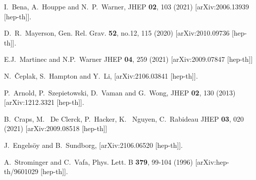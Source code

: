 \documentclass[11pt]{article}
\begin{document}
\begin{thebibliography}{99}
  
 
  
I.~Bena, A.~Houppe and N.~P.~Warner,
JHEP \textbf{02}, 103 (2021)
[arXiv:2006.13939 [hep-th]].
 
 


D.~R.~Mayerson,
Gen. Rel. Grav. \textbf{52}, no.12, 115 (2020)
[arXiv:2010.09736 [hep-th]].


E.J.~Martinec and N.P.~Warner
JHEP {\bf 04}, 259 (2021)
[arXiv:2009.07847 [hep-th]]


N.~Čeplak, S.~Hampton and Y.~Li,
[arXiv:2106.03841 [hep-th]].

 



P.~Arnold, P.~Szepietowski, D.~Vaman and G.~Wong,
JHEP \textbf{02}, 130 (2013)
[arXiv:1212.3321 [hep-th]].

B.~Craps, M.~ De Clerck, P.~Hacker, K.~ Nguyen, C.~Rabideau
JHEP {\bf 03}, 020 (2021)
[arXiv:2009.08518 [hep-th]]


J.~Engels\"oy and B.~Sundborg,
[arXiv:2106.06520 [hep-th]].


  
A.~Strominger and C.~Vafa,
Phys. Lett. B \textbf{379}, 99-104 (1996)
[arXiv:hep-th/9601029 [hep-th]].



\end{thebibliography}
\end{document}
